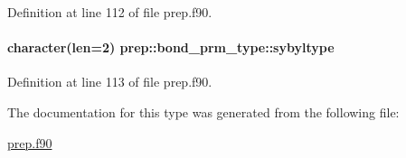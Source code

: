 Definition at line 112 of file prep.\-f90.

\hypertarget{structprep_1_1bond__prm__type_a9fceecf0d44443bdb2ed43fd6214e2e1}{
\paragraph[{sybyltype}]{\setlength{\rightskip}{0pt plus 5cm}character(len=2) prep\-::bond\-\_\-prm\-\_\-type\-::sybyltype}}\label{structprep_1_1bond__prm__type_a9fceecf0d44443bdb2ed43fd6214e2e1}


Definition at line 113 of file prep.\-f90.



The documentation for this type was generated from the following file\-:\begin{DoxyCompactItemize}
\item 
\hyperlink{prep_8f90}{prep.\-f90}\end{DoxyCompactItemize}
